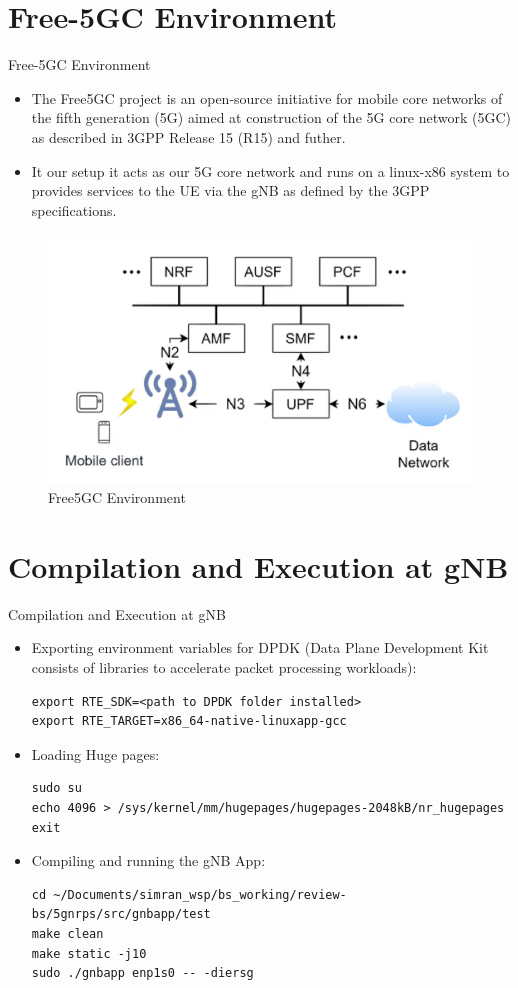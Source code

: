\documentclass[xcolor=table]{beamer}
\begin{document}
\section{Free-5GC Environment}
\begin{frame}{Free-5GC Environment}
	\begin{itemize}
    	\item The Free5GC project is an open-source initiative for mobile core networks of the fifth generation (5G) aimed  at construction of the 5G core network (5GC) as described in 3GPP Release 15 (R15) and futher.
    	\item It our setup it acts as our 5G core network and runs on a linux-x86 system to provides services to the UE via the gNB as defined by the 3GPP specifications.
    \end{itemize}

	\begin{figure}[h!]
  		\centering
  		\includegraphics[width=0.7\linewidth]{./figs/Free5GC.png}
  		\caption{Free5GC Environment}
  		\label{Free5GC}
	\end{figure}
\end{frame} 

\section{Compilation and Execution at gNB}
\begin{frame}[fragile]{Compilation and Execution at gNB}
\begin{itemize}
    	\item Exporting environment variables for DPDK (Data Plane Development Kit consists of libraries to accelerate packet processing workloads):
\begin{lstlisting}
export RTE_SDK=<path to DPDK folder installed>
export RTE_TARGET=x86_64-native-linuxapp-gcc
\end{lstlisting}
	\item Loading Huge pages:
	\begin{lstlisting}
sudo su
echo 4096 > /sys/kernel/mm/hugepages/hugepages-2048kB/nr_hugepages
exit
\end{lstlisting}
\item Compiling and running the gNB App:
\begin{lstlisting}
cd ~/Documents/simran_wsp/bs_working/review-bs/5gnrps/src/gnbapp/test
make clean
make static -j10
sudo ./gnbapp enp1s0 -- -diersg
\end{lstlisting}
\end{itemize}
\end{frame}
\end{document}
